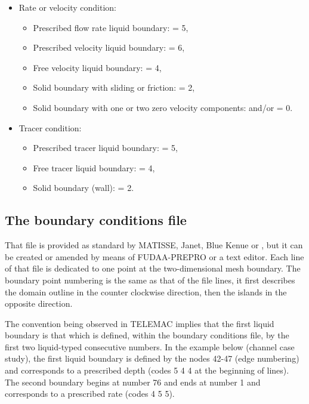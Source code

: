 \begin{itemize}
\item Rate or velocity condition:

\begin{itemize}
\item Prescribed flow rate liquid boundary:  = 5,

\item Prescribed velocity liquid boundary:  = 6,

\item Free velocity liquid boundary:  = 4,

\item Solid boundary with sliding or friction:  = 2,

\item Solid boundary with one or two zero velocity components:  and/or
 = 0.
\end{itemize}

\item Tracer condition:

\begin{itemize}
\item Prescribed tracer liquid boundary:  = 5,

\item Free tracer liquid boundary:  = 4,

\item Solid boundary (wall):  = 2.
\end{itemize}
\end{itemize}


\subsection{The boundary conditions file}
\label{sec:bndfile}
That file is provided as standard by MATISSE, Janet, Blue Kenue or \stbtel, but
it can be created or amended by means of FUDAA-PREPRO or a text editor. Each
line of that file is dedicated to one point at the two-dimensional mesh
boundary. The boundary point numbering is the same as that of the file lines,
it first describes the domain outline in the counter clockwise direction, then
the islands in the opposite direction.

The convention being observed in TELEMAC implies that the first liquid boundary
is that which is defined, within the boundary conditions file, by the first two
liquid-typed consecutive numbers. In the example below (channel case study),
the first liquid boundary is defined by the nodes 42-47 (edge numbering) and
corresponds to a prescribed depth (codes 5 4 4 at the beginning of lines). The
second boundary begins at number 76 and ends at number 1 and corresponds to a
prescribed rate (codes 4 5 5).

